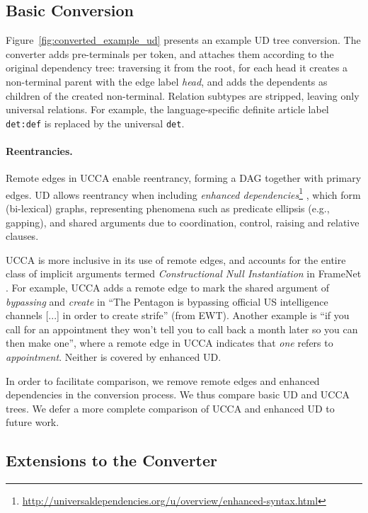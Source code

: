 \documentclass[11pt,a4paper]{article}
\begin{document}
\subsection{Basic Conversion}\label{sec:conversion}

Figure~\ref{fig:converted_example_ud} presents an example UD tree conversion.
The converter adds pre-terminals per token,
and attaches them according to the original dependency tree:
traversing it from the root, for each head it creates a non-terminal
parent with the edge label {\it head}, and adds the dependents as children of 
the created non-terminal.
Relation subtypes are stripped,
leaving only universal relations.
For example, the language-specific definite article label
\texttt{det:def} is replaced by the universal \texttt{det}.

\paragraph{Reentrancies.}
Remote edges in UCCA enable reentrancy, forming a DAG together with primary edges.
UD allows reentrancy when including \textit{enhanced dependencies}\footnote{\url{http://universaldependencies.org/u/overview/enhanced-syntax.html}}
\cite{SCHUSTER16.779}, which form (bi-lexical) graphs, representing phenomena
such as predicate ellipsis (e.g., gapping),
and shared arguments due to coordination, control, raising and relative clauses.

UCCA is more inclusive in its use of remote edges, and accounts for 
the entire class of implicit arguments termed {\it Constructional Null Instantiation} in FrameNet \citep{Ruppenhofer:16}.
For example, UCCA adds a remote edge to mark the shared argument of \textit{bypassing} and
\textit{create} in ``The Pentagon is bypassing official US intelligence channels [...] in order to create strife'' (from EWT). 
Another example is ``if you call for an appointment they won't tell you to call back a month later so you can then make one'',
where a remote edge in UCCA indicates that \textit{one} refers to \textit{appointment}.
Neither is covered by enhanced UD.

In order to facilitate comparison, we remove remote edges and enhanced dependencies in the conversion process.
We thus compare basic UD and UCCA trees. We defer a more complete comparison of UCCA and enhanced UD to future work.



\subsection{Extensions to the Converter}\label{sec:local}
\end{document}
